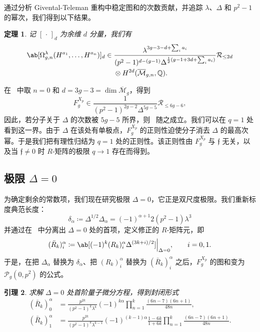 \documentclass{amsart}
\newtheorem{thm}{定理}[section]
\newtheorem{lem}[thm]{引理}
\theoremstyle{definition}
\theoremstyle{remark}
\theoremstyle{plain}
\theoremstyle{definition}
\theoremstyle{remark}
\newcommand{\Q}{\mathbb{Q}}
\newcommand{\Mbar}{\overline{\mathcal{M}}}
\newcommand{\mc}[1]{\mathcal{#1}}
\newcommand{\mf}[1]{\mathfrak{#1}}
\newcommand{\1}{\mathbf{1}}
\newcommand{\2}{\mathbf{2}}
\newcommand{\3}{\mathbf{3}}
\begin{document}
通过分析 Givental-Teleman 重构中稳定图和的次数贡献，并追踪 \(\lambda\)、\(\Delta\) 和 \(p^2-1\) 的幂次，我们得到以下结果。

\begin{thm}%
\label{thm:local P1 reconstruction}
    记 \([\,\cdot\,]_d\) 为余维 \(d\) 分量，我们有
    \begin{align*}
        \ab[\Omega^{\lambda}_{g,n}(H^{a_1},\ldots,H^{a_n})]_d \in{}& \frac{\lambda^{3g-3-d+\sum_i a_i}}{(p^2-1)^{d-(g-1)}\Delta^{\frac{1}{2}(g-1+3d+\sum_i a_i)}}\mc{R}_{\leq 2d} \\
        &\otimes H^{2d}(\Mbar_{g,n},\Q).
    \end{align*}
\end{thm}

在~ 中取 \(n=0\) 和 \(d = 3g-3 = \dim \Mbar_g\)，得到
\[ F_g^{X_p} \in \frac{1}{(p^2-1)^{2g-2}\Delta^{5g-5}}\mc{R}_{\leq 6g-6}, \]
因此，若分子关于 \(\Delta\) 的次数被 \(5g-5\) 所界，则~ 随之成立。我们可以在 \(q=1\) 处看到这一界。由于 \(\Delta\) 在该处有单极点，\(F_g^{X_p}\) 的正则性迫使分子消去 \(\Delta\) 的最高次幂。于是我们把有理性归结为 \(q=1\) 处的正则性。该正则性由 \(F_g^{X_p}\) 与 \(\mf{f}\) 无关，以及当 \(\mf{f} \neq 0\) 时 \(R\)-矩阵的极限 \(q \to 1\) 存在而得到。

\subsection{极限 \(\Delta = 0\)}%
\label{sub:The limit Delta = 0}

为确定剩余的常数项，我们现在研究极限 \(\Delta = 0\)，它正是双尺度极限。我们重新标度典范长度：
\[ \delta_{\alpha} \coloneqq \Delta^{1/2}\Delta_{\alpha} = (-1)^{\alpha+1}2(p^2-1)\lambda^3 \]
并通过在~ 中分离出 \(\Delta = 0\) 处的首项，定义修正的 \(R\)-矩阵元，即
\[ (\bar{R}_k)_i^{\alpha} \coloneqq \ab[(-1)^k (R_k)_i^{\alpha}\Delta^{(3k+i)/2}]\Big|_{\Delta=0}, \qquad i = 0,1. \]
于是，在把 \(\Delta_{\alpha}\) 替换为 \(\delta_{\alpha}\)、把 \((R_k)_i^{\alpha}\) 替换为 \((\bar{R}_k)_i^{\alpha}\) 之后，\(F_g^{X_p}\) 的图和变为 \(\mc{P}_g(0,p^2)\) 的公式。

\begin{lem}%
\label{lem:R matrix at Delta zero}
    求解 \(\Delta = 0\) 处首阶量子微分方程，得到封闭形式
    \begin{align*}
        (\bar{R}_k)_0^{\alpha} &= \frac{p^{2k}}{(p^2-1)^k\lambda^k}(-1)^{k\alpha}\prod_{n=1}^k \frac{(6n-7)(6n+1)}{48n}, \\
        (\bar{R}_k)_1^{\alpha} &= \frac{p^{2k}}{(p^2-1)^k \lambda^{k-1}}(-1)^{(k-1)\alpha}\frac{1-6k}{1+6k}\prod_{n=1}^k \frac{(6n-7)(6n+1)}{48n}.
    \end{align*}
\end{lem}
\end{document}
